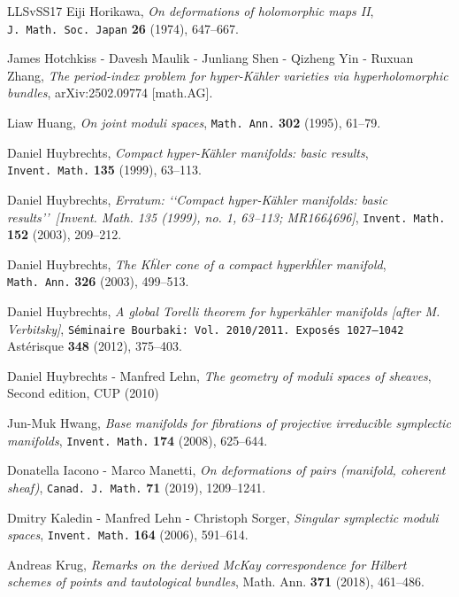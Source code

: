 \documentclass[11pt]{amsart}
\theoremstyle{definition}
\theoremstyle{remark}
\begin{document}
\begin{thebibliography}{LLSvSS17}
 Eiji Horikawa, \emph{On deformations of holomorphic maps {II}\/}, 
{\tt  J.~Math.~Soc.~Japan} {\bf   26} (1974), 647--667.

 James Hotchkiss - Davesh Maulik - Junliang Shen - Qizheng Yin - Ruxuan Zhang,
\emph{The period-index problem for hyper-K\"ahler varieties via hyperholomorphic bundles\/}, 
arXiv:2502.09774  [math.AG].


 Liaw Huang, 
\emph{On joint moduli spaces\/}, 
{\tt Math.~Ann.} {\bf   302} (1995),  61--79.

 Daniel Huybrechts, 
\emph{Compact hyper-K\"ahler manifolds: basic results\/}, 
{\tt Invent.~Math.} {\bf  135} (1999),  63--113.

 Daniel Huybrechts, 
\emph{Erratum: \lq\lq Compact hyper-K\"ahler manifolds: basic results\rq\rq\ [Invent. Math. 135 (1999), no. 1, 63–113; MR1664696]\/}, 
{\tt Invent. Math.} {\bf   152} (2003), 209--212.

 Daniel Huybrechts, 
\emph{The K\"hler cone of a compact hyperk\"hler manifold\/}, 
{\tt Math.~Ann.} {\bf   326} (2003),  499--513.

 Daniel Huybrechts, 
\emph{A global Torelli theorem for hyperk\"ahler manifolds [after M. Verbitsky]\/}, 
{\tt S\'eminaire Bourbaki: Vol. 2010/2011. Exposés 1027–1042}
Astérisque {\bf   348} (2012),  375--403.


 Daniel Huybrechts - Manfred  Lehn, 
\emph{The geometry of moduli spaces of sheaves\/}, 
Second edition, CUP (2010)


 Jun-Muk Hwang, 
\emph{Base manifolds for fibrations of projective irreducible symplectic manifolds\/}, 
{\tt Invent.~Math.} {\bf  174} (2008),  625--644.


 Donatella Iacono - Marco Manetti, 
\emph{On deformations of pairs (manifold, coherent sheaf)\/}, 
{\tt Canad.~J.~Math.} {\bf   71} (2019),  1209--1241.


 Dmitry Kaledin - Manfred  Lehn - Christoph Sorger, 
\emph{Singular symplectic moduli spaces\/}, 
{\tt Invent. Math.} {\bf  164} (2006), 591--614.

 
 Andreas Krug, \emph{Remarks on the derived McKay correspondence for Hilbert schemes of points and tautological bundles}, Math. Ann. \textbf{371} (2018), 461--486. 


\end{thebibliography}
\end{document}
